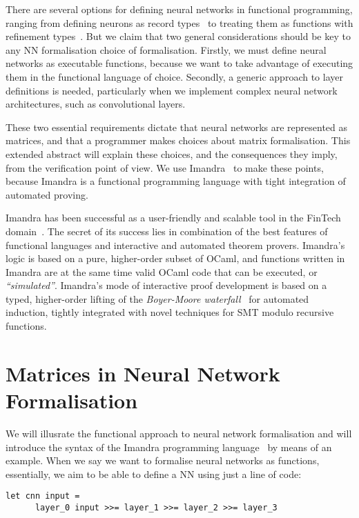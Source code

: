 \documentclass[runningheads]{llncs}
\begin{document}
There are several options for defining neural networks in functional programming, ranging from
defining neurons as record types~\cite{MariaBLFGRG22} to treating them as
functions with refinement types~\cite{KokkeKKAA20}. But we claim that two general considerations
should be key to any NN formalisation choice of formalisation. Firstly, we must define neural networks
as executable functions, because we want to take advantage of executing  them   in
the functional language of choice. Secondly, a generic approach
to layer definitions is needed, particularly when we implement complex neural network architectures, such as convolutional layers.

These two essential requirements dictate that neural networks are represented as matrices, and that a programmer makes choices about matrix formalisation.
This extended abstract will explain these choices, and the consequences they imply, from the verification point of view.
We use Imandra~\cite{PassmoreCIABKKM20} to make these points, because Imandra is a functional programming language with tight integration of automated proving.

Imandra has been
successful as a user-friendly and scalable tool in the FinTech
domain~\cite{Passmore21}. The secret of its success lies in combination of the
best features of functional languages and interactive and automated theorem
provers. Imandra's logic is based on a pure, higher-order subset of OCaml, and
functions written in Imandra are at the same time valid OCaml code that can be
executed, or \emph{``simulated''}. Imandra's mode of interactive proof
development is based on a typed, higher-order lifting of the \emph{Boyer-Moore
waterfall}~\cite{BM79} for automated induction, tightly integrated with novel
techniques for SMT modulo recursive functions.


\section{Matrices in Neural Network Formalisation}
We will illusrate the functional approach to neural network formalisation and will introduce the syntax of the Imandra programming language~\cite{PassmoreCIABKKM20} by means of an example.
When we say we want to formalise neural networks as functions,
essentially, we aim to be able to define a NN using just a line of code:

\begin{lstlisting}[language=caml, label={lst:model}]
  let cnn input =
      layer_0 input >>= layer_1 >>= layer_2 >>= layer_3
\end{lstlisting}
\end{document}
